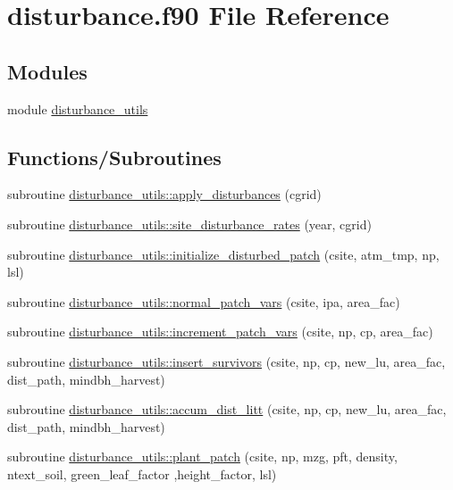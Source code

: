 \hypertarget{disturbance_8f90}{}\section{disturbance.\+f90 File Reference}
\label{disturbance_8f90}
\subsection*{Modules}
\begin{DoxyCompactItemize}
\item 
module \hyperlink{namespacedisturbance__utils}{disturbance\+\_\+utils}
\end{DoxyCompactItemize}
\subsection*{Functions/\+Subroutines}
\begin{DoxyCompactItemize}
\item 
subroutine \hyperlink{namespacedisturbance__utils_a29d6db4e94463404643e5c3666c67767}{disturbance\+\_\+utils\+::apply\+\_\+disturbances} (cgrid)
\item 
subroutine \hyperlink{namespacedisturbance__utils_a9045765ed99ce8acf000838b2c532deb}{disturbance\+\_\+utils\+::site\+\_\+disturbance\+\_\+rates} (year, cgrid)
\item 
subroutine \hyperlink{namespacedisturbance__utils_a31b6105dc67086438d6827bbffaf4bc4}{disturbance\+\_\+utils\+::initialize\+\_\+disturbed\+\_\+patch} (csite, atm\+\_\+tmp, np, lsl)
\item 
subroutine \hyperlink{namespacedisturbance__utils_ae56e66a56b934ca784a19bd3c0bc2796}{disturbance\+\_\+utils\+::normal\+\_\+patch\+\_\+vars} (csite, ipa, area\+\_\+fac)
\item 
subroutine \hyperlink{namespacedisturbance__utils_a60d031d31fcde31370f73cebaaaadb24}{disturbance\+\_\+utils\+::increment\+\_\+patch\+\_\+vars} (csite, np, cp, area\+\_\+fac)
\item 
subroutine \hyperlink{namespacedisturbance__utils_ac25d6a408136dff3bccca56269ca858f}{disturbance\+\_\+utils\+::insert\+\_\+survivors} (csite, np, cp, new\+\_\+lu, area\+\_\+fac, dist\+\_\+path, mindbh\+\_\+harvest)
\item 
subroutine \hyperlink{namespacedisturbance__utils_a5e78ef6d3bd2f31c0abfaf8e86045187}{disturbance\+\_\+utils\+::accum\+\_\+dist\+\_\+litt} (csite, np, cp, new\+\_\+lu, area\+\_\+fac, dist\+\_\+path, mindbh\+\_\+harvest)
\item 
subroutine \hyperlink{namespacedisturbance__utils_a9fc5ab9ef8e1fa7eb1798412d868db50}{disturbance\+\_\+utils\+::plant\+\_\+patch} (csite, np, mzg, pft, density, ntext\+\_\+soil, green\+\_\+leaf\+\_\+factor                                                                                                                                           ,height\+\_\+factor, lsl)
\end{DoxyCompactItemize}
